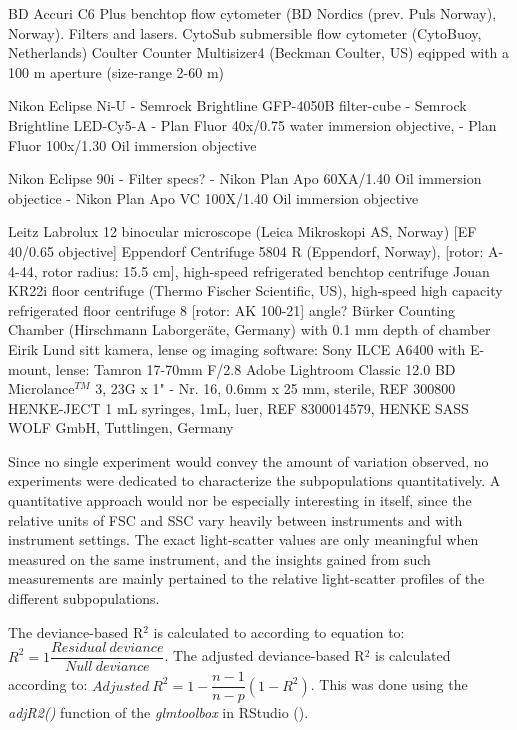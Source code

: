 
BD Accuri C6 Plus benchtop flow cytometer (BD Nordics (prev. Puls Norway), Norway). Filters and lasers.
CytoSub submersible flow cytometer (CytoBuoy, Netherlands)
Coulter Counter Multisizer4 (Beckman Coulter, US) eqipped with a 100 \micro m aperture (size-range 2-60 \micro m)

Nikon Eclipse Ni-U
- Semrock Brightline GFP-4050B filter-cube
- Semrock Brightline LED-Cy5-A
- Plan Fluor 40x/0.75 water immersion objective,
- Plan Fluor 100x/1.30 Oil immersion objective

Nikon Eclipse 90i
- Filter specs?
- Nikon Plan Apo 60XA/1.40 Oil immersion objectice
- Nikon Plan Apo VC 100X/1.40 Oil immersion objective

Leitz Labrolux 12 binocular microscope (Leica Mikroskopi AS, Norway) [EF 40/0.65 objective]
Eppendorf Centrifuge 5804 R (Eppendorf, Norway), [rotor: A-4-44, rotor radius: 15.5 cm], high-speed refrigerated benchtop centrifuge
Jouan KR22i floor centrifuge (Thermo Fischer Scientific, US), high-speed high capacity refrigerated floor centrifuge 8 [rotor: AK 100-21] angle?
Bürker Counting Chamber (Hirschmann Laborgeräte, Germany) with 0.1 mm depth of chamber
Eirik Lund sitt kamera, lense og imaging software: 
Sony ILCE A6400 with E-mount, lense: Tamron 17-70mm F/2.8 
Adobe\textsuperscript{\textregistered} Lightroom Classic 12.0 
BD Microlance$^{TM}$ 3, 23G x 1" - Nr. 16, 0.6mm x 25 mm, sterile, REF 300800
HENKE-JECT 1 mL syringes, 1mL, luer, REF 8300014579, HENKE SASS WOLF GmbH, Tuttlingen, Germany

Since no single experiment would convey the amount of variation observed, no experiments were dedicated to characterize the subpopulations quantitatively. A quantitative approach would nor be especially interesting in itself, since the relative units of FSC and SSC vary heavily between instruments and with instrument settings. The exact light-scatter values are only meaningful when measured on the same instrument, and the insights gained from such measurements are mainly pertained to the relative light-scatter profiles of the different subpopulations.

The deviance-based R$^{2}$ is calculated to according to equation to: $R^{2} = 1 \dfrac{Residual ~ deviance}{Null ~ deviance}$. The adjusted deviance-based R$^{2}$ is calculated according to: $Adjusted ~ R^{2} = 1 - \dfrac{n-1}{n-p}(1 - R^{2})$. This was done using the \emph{adjR2()} function of the \emph{glmtoolbox} in RStudio (\cite{RStudio}).

